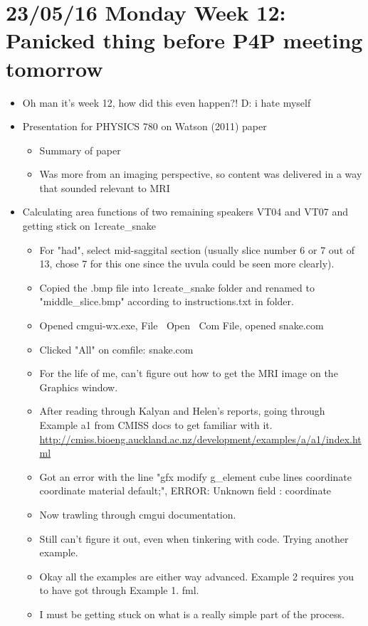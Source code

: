 \documentclass{article}
\begin{document}
\section*{23/05/16 Monday Week 12: Panicked thing before P4P meeting tomorrow}
\begin{itemize}
    \item Oh man it's week 12, how did this even happen?! D: i hate myself
    
    \item Presentation for PHYSICS 780 on Watson (2011) paper
    \begin{itemize}
        \item Summary of paper
        \item Was more from an imaging perspective, so content was delivered in a way that sounded relevant to MRI
    \end{itemize}
    
    \item Calculating area functions of two remaining speakers VT04 and VT07 and getting stick on 1create\_snake
    \begin{itemize}
        \item For "had", select mid-saggital section (usually slice number 6 or 7 out of 13, chose 7 for this one since the uvula could be seen more clearly).
        \item Copied the .bmp file into 1create\_snake folder and renamed to "middle\_slice.bmp" according to instructions.txt in folder.
        \item Opened cmgui-wx.exe, File $\>$ Open $\>$ Com File, opened snake.com
        \item Clicked "All" on comfile: snake.com
        \item For the life of me, can't figure out how to get the MRI image on the Graphics window.
        \item After reading through Kalyan and Helen's reports, going through Example a1 from CMISS docs to get familiar with it. \url{http://cmiss.bioeng.auckland.ac.nz/development/examples/a/a1/index.html}
        \item Got an error with the line "gfx modify g\_element cube lines coordinate coordinate material default;", ERROR: Unknown field : coordinate
        \item Now trawling through cmgui documentation.
        \item Still can't figure it out, even when tinkering with code. Trying another example.
        \item Okay all the examples are either way advanced. Example 2 requires you to have got through Example 1. fml. 
        \item I must be getting stuck on what is a really simple part of the process.
    \end{itemize}
    

\end{itemize}
\end{document}
